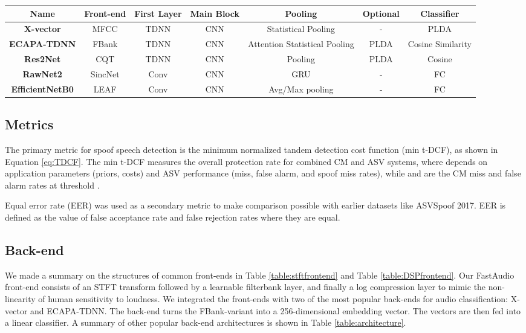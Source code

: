 \documentclass[conference]{IEEEtran}
\begin{document}
\begin{table*}[htb!]
\caption{\label{table:architecture} A stage-wise comparison of different Architectures}
\begin{center}
\begin{tabular}{c|c|c|c|c|c|c}
\hline
\textbf {Name} & \textbf{Front-end} & \textbf{First Layer} & \textbf{Main Block} & \textbf{Pooling} & \textbf{Optional} &\textbf{Classifier} \\
\hline
\textbf {X-vector} & MFCC & TDNN & CNN & Statistical Pooling & - & PLDA \\
\hline
\textbf {ECAPA-TDNN} & FBank & TDNN & CNN & Attention Statistical Pooling & PLDA & Cosine Similarity\\
\hline
\textbf {Res2Net} & CQT & TDNN & CNN & Pooling & PLDA & Cosine \\
\hline
\textbf {RawNet2} & SincNet & Conv & CNN & GRU & - & FC \\
\hline
\textbf {EfficientNetB0} & LEAF & Conv & CNN & Avg/Max pooling & - & FC \\
\hline
\end{tabular}
\end{center}
\end{table*}

\subsection{Metrics}

The primary metric for spoof speech detection is the minimum normalized tandem detection cost function (min t-DCF), as shown in Equation \ref{eq:TDCF}. The min t-DCF measures the overall protection rate for combined CM and ASV systems, where  depends on application parameters (priors, costs) and ASV performance (miss, false alarm, and spoof miss rates), while  and  are the CM miss and false alarm rates at threshold \cite{Todisco2019ASVspoof2F}.



Equal error rate (EER) was used as a secondary metric to make comparison possible with earlier datasets like ASVSpoof 2017. EER is defined as the value of false acceptance rate and false rejection rates where they are equal.


\subsection{Back-end}
We made a summary on the structures of common front-ends in Table \ref{table:stftfrontend} and Table \ref{table:DSPfrontend}. Our FastAudio front-end consists of an STFT transform followed by a learnable filterbank layer, and finally a log compression layer to mimic the non-linearity of human sensitivity to loudness. We integrated the front-ends with two of the most popular back-ends for audio classification: X-vector\cite{snyder2018x}\cite{Ravanelli2021SpeechBrainAG} and ECAPA-TDNN\cite{desplanques2020ecapa}\cite{Ravanelli2021SpeechBrainAG}. The back-end turns the FBank-variant into a 256-dimensional embedding vector. The vectors are then fed into a linear classifier. A summary of other popular back-end architectures is shown in Table \ref{table:architecture}.
\end{document}
